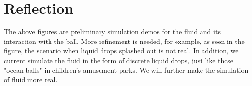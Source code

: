 \documentclass{article}
\newcommand\footurl[1]{\footnote{\url{#1}}}
\newcommand\urllink[2]{#1\footurl{#2}}
\begin{document}
\section{Reflection}
\hspace*{1em} The above figures are preliminary simulation demos for the fluid and its interaction with the ball. More refinement is needed, for example, as seen in the figure, the scenario when liquid drops splashed out is not real. 
\noindent\hspace*{1em} In addition, we current simulate the fluid in the form of discrete liquid drops, just like those "ocean balls" in children's amusement parks. We will further make the simulation of fluid more real.









\end{document}
